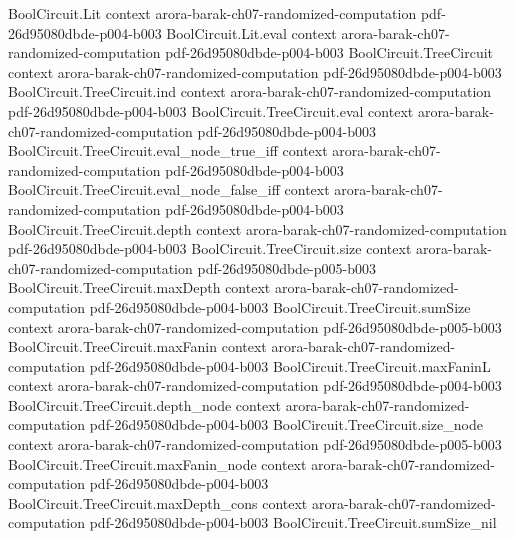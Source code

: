 \begin{theorem}
\label{Randomized.inBPP_iff_inBPPAt}
\leanok
{}
\proofstep
  {BoolCircuit.Lit}
  {context}
  {arora-barak-ch07-randomized-computation}
  {pdf-26d95080dbde-p004-b003}
\proofstep
  {BoolCircuit.Lit.eval}
  {context}
  {arora-barak-ch07-randomized-computation}
  {pdf-26d95080dbde-p004-b003}
\proofstep
  {BoolCircuit.TreeCircuit}
  {context}
  {arora-barak-ch07-randomized-computation}
  {pdf-26d95080dbde-p004-b003}
\proofstep
  {BoolCircuit.TreeCircuit.ind}
  {context}
  {arora-barak-ch07-randomized-computation}
  {pdf-26d95080dbde-p004-b003}
\proofstep
  {BoolCircuit.TreeCircuit.eval}
  {context}
  {arora-barak-ch07-randomized-computation}
  {pdf-26d95080dbde-p004-b003}
\proofstep
  {BoolCircuit.TreeCircuit.eval_node_true_iff}
  {context}
  {arora-barak-ch07-randomized-computation}
  {pdf-26d95080dbde-p004-b003}
\proofstep
  {BoolCircuit.TreeCircuit.eval_node_false_iff}
  {context}
  {arora-barak-ch07-randomized-computation}
  {pdf-26d95080dbde-p004-b003}
\proofstep
  {BoolCircuit.TreeCircuit.depth}
  {context}
  {arora-barak-ch07-randomized-computation}
  {pdf-26d95080dbde-p004-b003}
\proofstep
  {BoolCircuit.TreeCircuit.size}
  {context}
  {arora-barak-ch07-randomized-computation}
  {pdf-26d95080dbde-p005-b003}
\proofstep
  {BoolCircuit.TreeCircuit.maxDepth}
  {context}
  {arora-barak-ch07-randomized-computation}
  {pdf-26d95080dbde-p004-b003}
\proofstep
  {BoolCircuit.TreeCircuit.sumSize}
  {context}
  {arora-barak-ch07-randomized-computation}
  {pdf-26d95080dbde-p005-b003}
\proofstep
  {BoolCircuit.TreeCircuit.maxFanin}
  {context}
  {arora-barak-ch07-randomized-computation}
  {pdf-26d95080dbde-p004-b003}
\proofstep
  {BoolCircuit.TreeCircuit.maxFaninL}
  {context}
  {arora-barak-ch07-randomized-computation}
  {pdf-26d95080dbde-p004-b003}
\proofstep
  {BoolCircuit.TreeCircuit.depth_node}
  {context}
  {arora-barak-ch07-randomized-computation}
  {pdf-26d95080dbde-p004-b003}
\proofstep
  {BoolCircuit.TreeCircuit.size_node}
  {context}
  {arora-barak-ch07-randomized-computation}
  {pdf-26d95080dbde-p005-b003}
\proofstep
  {BoolCircuit.TreeCircuit.maxFanin_node}
  {context}
  {arora-barak-ch07-randomized-computation}
  {pdf-26d95080dbde-p004-b003}
\proofstep
  {BoolCircuit.TreeCircuit.maxDepth_cons}
  {context}
  {arora-barak-ch07-randomized-computation}
  {pdf-26d95080dbde-p004-b003}
\proofstep
  {BoolCircuit.TreeCircuit.sumSize_nil}

\end{theorem}

